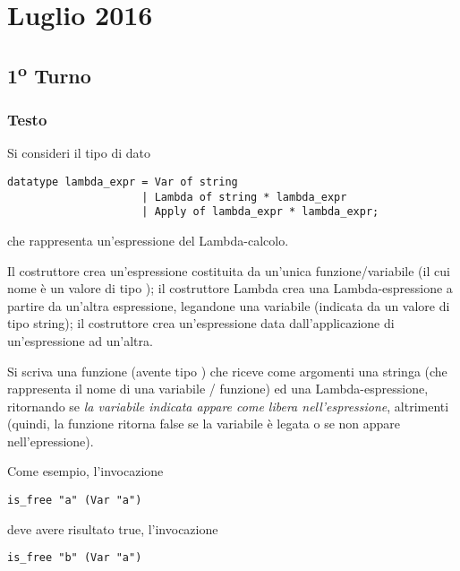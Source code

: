 \section{Luglio 2016}

\subsection{1\textsuperscript{o} Turno}

\subsubsection{Testo}

Si consideri il tipo di dato

\begin{lstlisting}[style = SML, caption = {Definizione del tipo di dato \sml{espressione Lambda}}]
datatype lambda_expr = Var of string
					 | Lambda of string * lambda_expr
					 | Apply of lambda_expr * lambda_expr;
\end{lstlisting}

che rappresenta un'espressione del Lambda-calcolo.

\medskip
Il costruttore  crea un'espressione costituita da un'unica funzione/variabile (il cui nome è un valore di tipo );
il costruttore Lambda crea una Lambda-espressione a partire da un'altra espressione, legandone una variabile (indicata da un valore di tipo string);
il costruttore  crea un'espressione data dall'applicazione di un'espressione ad un'altra.

\medskip
Si scriva una funzione  (avente tipo ) che riceve come argomenti una stringa (che rappresenta il nome di una variabile / funzione) ed una Lambda-espressione, %
ritornando  se \emph{la variabile indicata appare come libera nell'espressione}, %
 altrimenti (quindi, la funzione ritorna false se la variabile è legata o se non appare nell'epressione).

\medskip
Come esempio, l'invocazione

\begin{lstlisting}[style = SML]
is_free "a" (Var "a")
\end{lstlisting}

deve avere risultato true, l'invocazione

\begin{lstlisting}[style = SML]
is_free "b" (Var "a")
\end{lstlisting}

